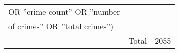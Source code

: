 \begin{table}[!ht]
\begin{center}
\begin{threeparttable}
\begin{tabular}{|l|l|l|}
                OR ''crime count'' OR ''number    &                                &                              \\
                of crimes'' OR ''total crimes'')  &                                &                              \\\hline
                                                  & Total                          & 2055                         \\
                \hline
            \end{tabular}
        \end{threeparttable}
    \end{center}
\end{table} \\